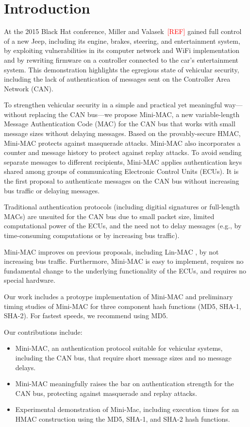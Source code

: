 \section{Introduction}

At the 2015 Black Hat conference, Miller and Valasek~\textcolor{red}{[REF]} gained full control of a new Jeep,
including its engine, brakes, steering, and entertainment system, by exploiting vulnerabilities in its
computer network and WiFi implementation and by rewriting firmware on a controller connected to the car's entertainment system.
This demonstration highlights the egregious state of vehicular security, including the lack of 
authentication of messages sent on the Controller Area Network (CAN).   

To strengthen vehicular security in a simple and practical 
yet meaningful way---without replacing the CAN bus---we propose Mini-MAC, 
a new variable-length Message Authentication Code (MAC)
for the CAN bus that works with small message sizes without delaying messages.  
Based on the provably-secure HMAC, Mini-MAC protects against masquerade attacks.  
Mini-MAC also incorporates a counter and message history to protect against replay attacks.
To avoid sending separate messages to different recipients, Mini-MAC applies authentication keys
shared among groups of communicating Electronic Control Units (ECUs).
It is the first proposal to authenticate messages on the CAN bus without increasing bus traffic
or delaying messages. 

Traditional authentication protocols (including digitial signatures or full-length MACs) are unsuited for the CAN bus due to
small packet size, limited computational power of the ECUs,
and the need not to delay messages (e.g., by time-consuming computations or by
increasing bus traffic).   

Mini-MAC improves on previous proposals, including Lin-MAC \cite{Lin-MAC}, by not increasing bus traffic.
Furthermore, Mini-MAC is easy to implement,
requires no fundamental change to the underlying functionality of the ECUs, and 
requires no special hardware.

Our work includes a protoype implementation of Mini-MAC and preliminary timing studies 
of Mini-MAC for three component hash functions (MD5, SHA-1, SHA-2).  For fastest speeds, 
we recommend using MD5.

Our contributions include:
\begin{itemize}

\item Mini-MAC, an authentication protocol suitable for vehicular systems, including the CAN bus, 
that require short message sizes and no message delays.

\item Mini-MAC meaningfully raises the bar on authentication strength for the CAN bus, protecting against
masquerade and replay attacks.

\item Experimental demonstration of Mini-Mac, including execution times for an HMAC
construction using the MD5, SHA-1, and SHA-2 hash functions.

\end{itemize}